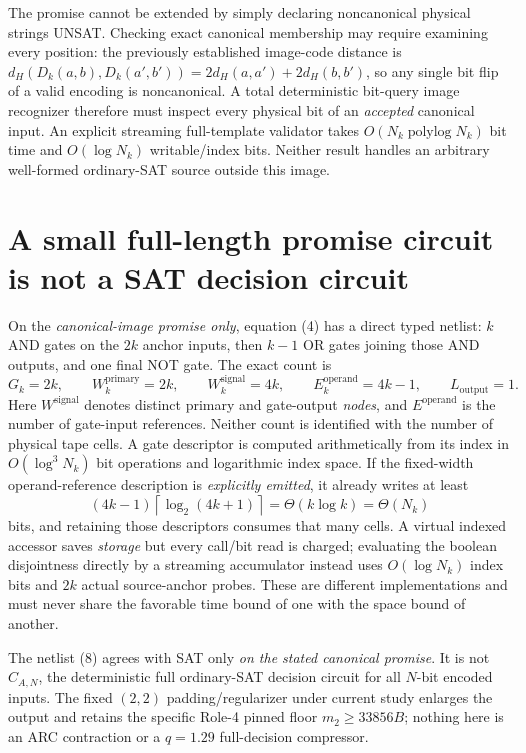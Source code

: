 \documentclass[11pt]{article}
\begin{document}
The promise cannot be extended by simply declaring noncanonical physical strings UNSAT.  Checking exact canonical membership may require examining every position: the previously established image-code distance is $d_H(D_k(a,b),D_k(a',b'))=2d_H(a,a')+2d_H(b,b')$, so any single bit flip of a valid encoding is noncanonical.  A total deterministic bit-query image recognizer therefore must inspect every physical bit of an \emph{accepted} canonical input. An explicit streaming full-template validator takes $O(N_k\operatorname{polylog}N_k)$ bit time and $O(\log N_k)$ writable/index bits.  Neither result handles an arbitrary well-formed ordinary-SAT source outside this image.

\section{A small full-length promise circuit is not a SAT decision circuit}
On the \emph{canonical-image promise only}, equation (4) has a direct typed netlist: $k$ AND gates on the $2k$ anchor inputs, then $k-1$ OR gates joining those AND outputs, and one final NOT gate.  The exact count is
\[
 G_k=2k,\qquad W^{\mathrm{primary}}_k=2k,\qquad
 W^{\mathrm{signal}}_k=4k,\qquad E^{\mathrm{operand}}_k=4k-1,
 \qquad L_{\mathrm{output}}=1.
\tag{8}
\]
Here $W^{\mathrm{signal}}$ denotes distinct primary and gate-output \emph{nodes}, and $E^{\mathrm{operand}}$ is the number of gate-input references.  Neither count is identified with the number of physical tape cells.  A gate descriptor is computed arithmetically from its index in $O(\log^3 N_k)$ bit operations and logarithmic index space. If the fixed-width operand-reference description is \emph{explicitly emitted}, it already writes at least
\[
(4k-1)\left\lceil\log_2(4k+1)\right\rceil
=\Theta(k\log k)=\Theta(N_k)
\tag{9}
\]
bits, and retaining those descriptors consumes that many cells. A virtual indexed accessor saves \emph{storage} but every call/bit read is charged; evaluating the boolean disjointness directly by a streaming accumulator instead uses $O(\log N_k)$ index bits and $2k$ actual source-anchor probes.  These are different implementations and must never share the favorable time bound of one with the space bound of another.

The netlist (8) agrees with SAT only \emph{on the stated canonical promise}. It is not $C_{A,N}$, the deterministic full ordinary-SAT decision circuit for all $N$-bit encoded inputs. The fixed $(2,2)$ padding/regularizer under current study enlarges the output and retains the specific Role-4 pinned floor $m_2\ge33856B$; nothing here is an ARC contraction or a $q=1.29$ full-decision compressor.
\end{document}

